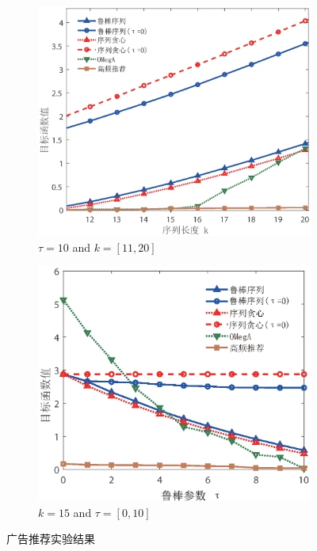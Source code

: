 \begin{figure}[H]
    \medskip

    \begin{subfigure}{0.45\textwidth}
       \includegraphics[width=\linewidth]{figure/rosenets/rec/rec-fun1}
        \caption{$\tau=10$ and $k=[11,20]$}
        \label{fig:rec-fun}
    \end{subfigure}
    \hfill
    \begin{subfigure}{0.45\textwidth}
        \includegraphics[width=\linewidth]{figure/rosenets/rec/rec-fun1-t}
        \caption{$k=15$ and $\tau=[0,10]$}
        \label{fig:rec-fun-t}
    \end{subfigure}
    \caption{广告推荐实验结果\label{fig:rec}}
\end{figure}

